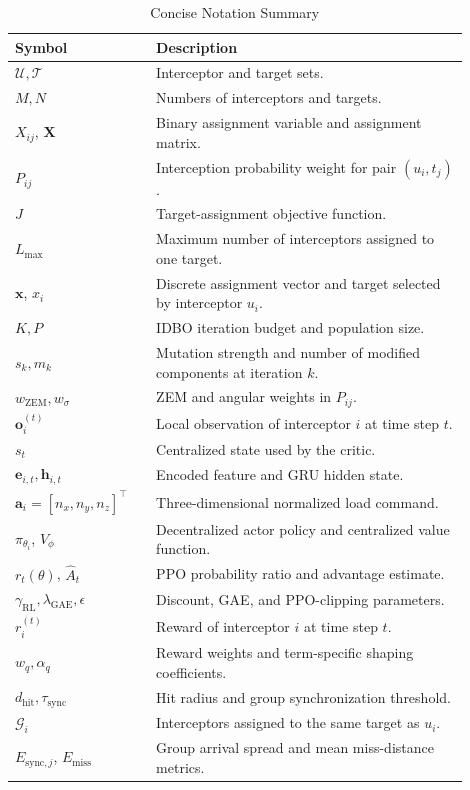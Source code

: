 \documentclass[lettersize,journal]{IEEEtran}
\begin{document}
\begin{table}[!t]
\centering
\caption{Concise Notation Summary}
\label{tab:notation}
\renewcommand{\arraystretch}{1.15}
\footnotesize
\begin{tabular}{p{0.28\linewidth}p{0.62\linewidth}}
\toprule
Symbol & Description \\
\midrule
$\mathcal{U},\mathcal{T}$ & Interceptor and target sets. \\
$M,N$ & Numbers of interceptors and targets. \\
$X_{ij}$, $\mathbf{X}$ & Binary assignment variable and assignment matrix. \\
$P_{ij}$ & Interception probability weight for pair $(u_i,t_j)$. \\
$J$ & Target-assignment objective function. \\
$L_{\max}$ & Maximum number of interceptors assigned to one target. \\
$\mathbf{x}$, $x_i$ & Discrete assignment vector and target selected by interceptor \(u_i\). \\
$K,P$ & IDBO iteration budget and population size. \\
$s_k,m_k$ & Mutation strength and number of modified components at iteration \(k\). \\
$w_{\mathrm{ZEM}},w_\sigma$ & ZEM and angular weights in \(P_{ij}\). \\
$\mathbf{o}_i^{(t)}$ & Local observation of interceptor $i$ at time step $t$. \\
$s_t$ & Centralized state used by the critic. \\
$\mathbf{e}_{i,t},\mathbf{h}_{i,t}$ & Encoded feature and GRU hidden state. \\
$\mathbf{a}_i=[n_x,n_y,n_z]^\top$ & Three-dimensional normalized load command. \\
$\pi_{\theta_i}$, $V_{\phi}$ & Decentralized actor policy and centralized value function. \\
$r_t(\theta)$, $\hat{A}_t$ & PPO probability ratio and advantage estimate. \\
$\gamma_{\mathrm{RL}},\lambda_{\mathrm{GAE}},\epsilon$ & Discount, GAE, and PPO-clipping parameters. \\
$r_i^{(t)}$ & Reward of interceptor $i$ at time step $t$. \\
$w_q,\alpha_q$ & Reward weights and term-specific shaping coefficients. \\
$d_{\mathrm{hit}},\tau_{\mathrm{sync}}$ & Hit radius and group synchronization threshold. \\
$\mathcal{G}_i$ & Interceptors assigned to the same target as $u_i$. \\
$E_{\mathrm{sync},j}$, $E_{\mathrm{miss}}$ & Group arrival spread and mean miss-distance metrics. \\
\bottomrule
\end{tabular}
\end{table}
\end{document}
